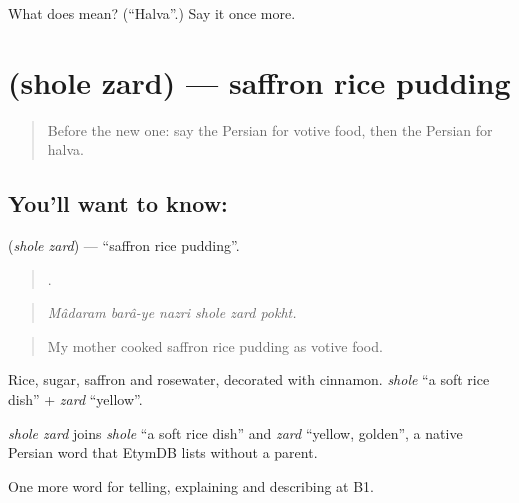 \begin{tcolorbox}[breakable,colback=teal!4,colframe=teal!35!black,title={Before you move on}]
What does  mean? (\textquotedblleft{}Halva\textquotedblright{}.) Say it once more.
\end{tcolorbox}
\section[\texorpdfstring{\fa{شله} \fa{زرد} (shole zard)}{شله زرد (shole zard)}]{  (shole zard) — saffron rice pudding}

\label{lesson:FA-C344-shole-zard}



\begin{quote}
Before the new one: say the Persian for votive food, then the Persian for halva.
\end{quote}

\subsection*{You'll want to know:  }
\textbf{ } (\emph{shole zard}) — \textquotedblleft{}saffron rice pudding\textquotedblright{}.

\begin{quote}
     .
\end{quote}

\begin{quote}
\emph{Mâdaram barâ-ye nazri shole zard pokht.}
\end{quote}

\begin{quote}
My mother cooked saffron rice pudding as votive food.
\end{quote}

Rice, sugar, saffron and rosewater, decorated with cinnamon. \emph{shole} \textquotedblleft{}a soft rice dish\textquotedblright{} + \emph{zard} \textquotedblleft{}yellow\textquotedblright{}.

\begin{cousinweb}
\emph{shole zard} joins \emph{shole} \textquotedblleft{}a soft rice dish\textquotedblright{} and \emph{zard} \textquotedblleft{}yellow, golden\textquotedblright{}, a native Persian word that EtymDB lists without a parent.
\end{cousinweb}

\begin{grammarlens}[title={What you've built}]
One more word for telling, explaining and describing at B1.
\end{grammarlens}

